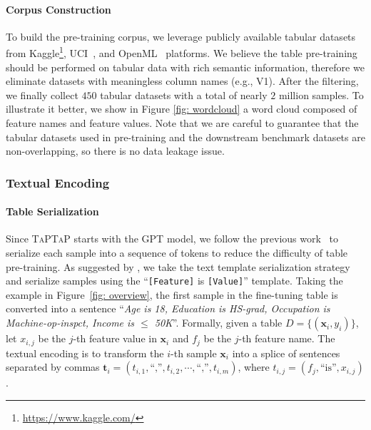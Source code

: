 \paragraph{Corpus Construction} To build the pre-training corpus, we leverage publicly available tabular datasets from Kaggle\footnote{\url{https://www.kaggle.com/}}, UCI~\cite{UCI}, and OpenML~\cite{DBLP:journals/sigkdd/openml} platforms. We believe the table pre-training should be performed on tabular data with rich semantic information, therefore we eliminate datasets with meaningless column names (e.g., V1). After the filtering, we finally collect $450$ tabular datasets with a total of nearly $2$ million samples. To illustrate it better, we show in Figure \ref{fig: wordcloud} a word cloud composed of feature names and feature values. Note that we are careful to guarantee that the tabular datasets used in pre-training and the downstream benchmark datasets are non-overlapping, so there is no data leakage issue.

\subsubsection{Textual Encoding}

\paragraph{Table Serialization} Since \textsc{TaPTaP} starts with the GPT model, we follow the previous work~\citep{GReaT,liu2022tapex} to serialize each sample into a sequence of tokens to reduce the difficulty of table pre-training. As suggested by \citet{tabllm}, we take the text template serialization strategy and serialize samples using the ``\texttt{[Feature]} is \texttt{[Value]}'' template. Taking the example in Figure~\ref{fig: overview}, the first sample in the fine-tuning table is converted into a sentence ``\textit{Age is 18, Education is HS-grad, Occupation is Machine-op-inspct, Income is $\leq$ 50K}''. Formally, given a table $D=\{(\mathbf{x}_i,y_i)\}$, let $x_{i,j}$ be the $j$-th feature value in $\mathbf{x}_i$ and $f_j$ be the $j$-th feature name. The textual encoding is to transform the $i$-th sample $\mathbf{x}_i$ into a splice of sentences separated by commas $\mathbf{t}_i=(t_{i,1},\text{``,''},t_{i,2},\cdots,\text{``,''},t_{i,m})$, where $t_{i,j}=(f_j,\text{``is''},x_{i,j})$.

